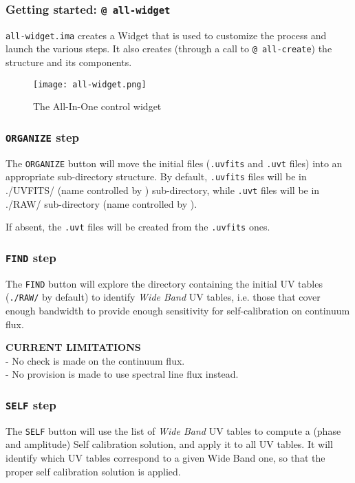 \subsubsection{Getting started: \texttt{@ all-widget}}

\texttt{all-widget.ima} creates a Widget that is used to customize
the process and launch the various steps. It also creates
(through a call to \texttt{@ all-create}) the  structure
and its components.
\begin{figure}[!h]
  \centering
  \texttt{[image: all-widget.png]}
  \caption{The All-In-One control widget
\label{fig:allwidget}}
\end{figure}

\subsubsection{\texttt{ORGANIZE} step}
The \texttt{ORGANIZE} button will move the initial files
(\texttt{.uvfits} and \texttt{.uvt} files) into an appropriate sub-directory
structure. By default, \texttt{.uvfits} files will be in ./UVFITS/
(name controlled by )
sub-directory, while \texttt{.uvt} files will be in ./RAW/ sub-directory
(name controlled by ).

If absent, the \texttt{.uvt} files will be created from the \texttt{.uvfits} ones.

\subsubsection{\texttt{FIND} step}

The \texttt{FIND} button will explore the directory containing
the initial UV tables (\texttt{./RAW/} by default) to identify
\textit{Wide Band} UV tables, i.e. those that cover enough 
bandwidth to provide enough sensitivity
for self-calibration on continuum flux.

\textbf{CURRENT LIMITATIONS} \\
- No check is made on the continuum flux.\\
- No provision is made to use spectral line flux instead.\\

\subsubsection{\texttt{SELF} step}

The \texttt{SELF} button will use the list of \textit{Wide Band}
UV tables to compute a (phase and amplitude) Self calibration
solution, and apply it to all UV tables. It will identify which
UV tables correspond to a given Wide Band one, so that the proper
self calibration solution is applied.

